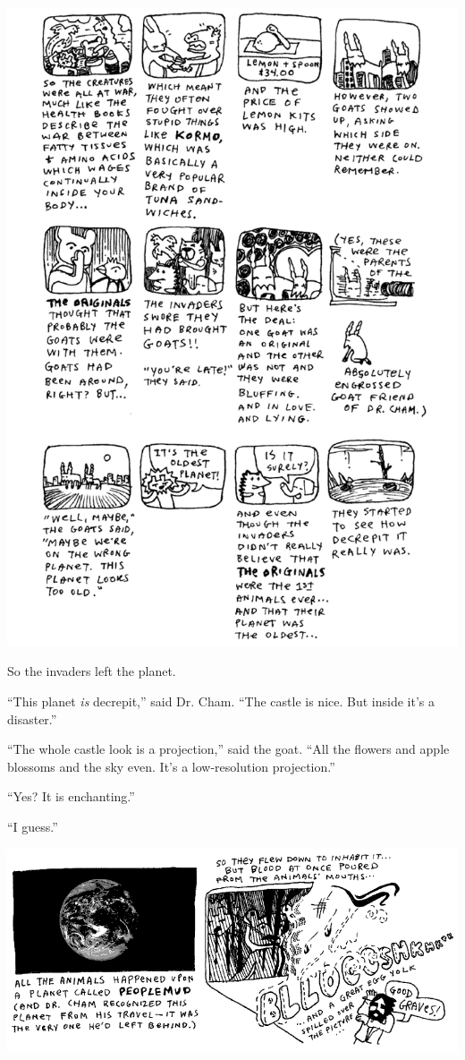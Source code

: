 \documentclass[10pt,twoside]{report}
\begin{document}
	\includegraphics[width=1.0\textwidth]{cache/46.png}

So the invaders left the planet.

``This planet {\em is} decrepit,'' said Dr. Cham.  ``The castle is
nice.  But inside it's a disaster.''

``The whole castle look is a projection,'' said the goat.  ``All the
flowers and apple blossoms and the sky even.  It's a low-resolution
projection.''

``Yes?  It is enchanting.''

``I guess.''

	\includegraphics[width=1.0\textwidth]{cache/47.png}
\end{document}
